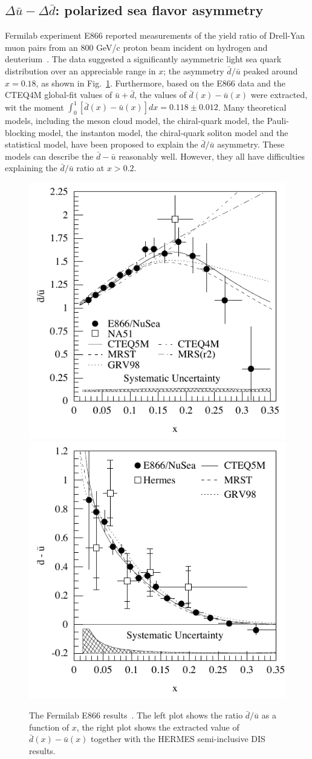 \subsection{$\Delta \bar{u} - \Delta \bar{d}$: polarized sea flavor asymmetry}
 Fermilab experiment E866 reported measurements of the 
 yield ratio of Drell-Yan muon pairs
 from an 800 GeV/c proton beam incident on hydrogen and deuterium~\cite{e8661,e8662}. 
The data suggested a significantly  asymmetric light sea quark distribution over an 
 appreciable range in $x$; the asymmetry $\bar{d}/\bar{u}$ peaked around $x=0.18$, as shown in Fig.~\ref{fig:e866}.
 Furthermore, based on the E866 data and the CTEQ4M global-fit values of $\bar{u}+\bar{d}$,  
 the values of $\bar{d}(x) - \bar{u}(x)$ were extracted, wit the moment
 $\int_{0}^{1} \left[ \bar{d}(x) - \bar{u}(x) \right]dx = 0.118 \pm 0.012$.
 Many theoretical models, including the meson cloud model, the chiral-quark model,
the Pauli-blocking model, the instanton model, the chiral-quark soliton model and 
the statistical model, have been proposed to explain the $\bar{d}/\bar{u}$ asymmetry.
These models can describe the $\bar{d}-\bar{u}$ reasonably well. However, they all have difficulties 
explaining the $\bar{d}/\bar{u}$ ratio at $x>0.2$.  
\begin{figure}[htbp]
\centerline{
\includegraphics[width=0.50\linewidth]{figs_xj/e866_dbub.pdf}
\includegraphics[width=0.50\linewidth]{figs_xj/e866_dmu.pdf}
}
\vspace{-2mm}
\caption{The Fermilab E866 results~\protect\cite{e8661,e8662}. 
The left plot shows the ratio  ${\bar d}/{\bar u}$ as a function of $x$, the right plot 
shows the extracted  value of $\bar{d}(x) - \bar{u}(x)$ together with the HERMES semi-inclusive  
DIS results.
}
\label{fig:e866}
\end{figure}
